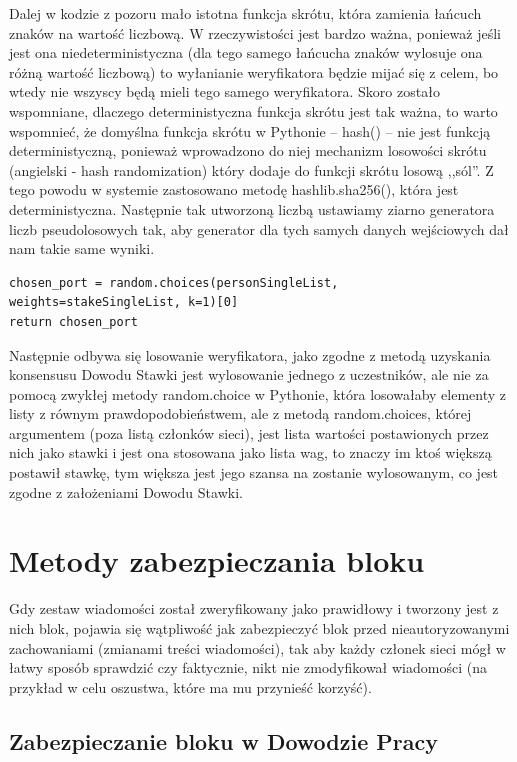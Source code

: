 Dalej w kodzie z pozoru mało istotna funkcja skrótu, która zamienia łańcuch znaków na wartość liczbową. W rzeczywistości jest bardzo ważna, ponieważ jeśli jest ona niedeterministyczna (dla tego samego łańcucha znaków wylosuje ona różną wartość liczbową) to wyłanianie weryfikatora będzie mijać się z celem, bo wtedy nie wszyscy będą mieli tego samego weryfikatora. Skoro zostało wspomniane, dlaczego deterministyczna funkcja skrótu jest tak ważna, to warto wspomnieć, że domyślna funkcja skrótu w Pythonie – hash() – nie jest funkcją deterministyczną, ponieważ wprowadzono do niej mechanizm losowości skrótu (angielski - hash randomization) który dodaje do funkcji skrótu losową ,,sól”. Z tego powodu w systemie zastosowano metodę hashlib.sha256(), która jest deterministyczna. Następnie tak utworzoną liczbą ustawiamy ziarno generatora liczb pseudolosowych tak, aby generator dla tych samych danych wejściowych dał nam takie same wyniki.

\begin{lstlisting}[caption={Losowanie weryfikatora}]
chosen_port = random.choices(personSingleList, 
weights=stakeSingleList, k=1)[0]
return chosen_port
\end{lstlisting}

Następnie odbywa się losowanie weryfikatora, jako zgodne z metodą uzyskania konsensusu Dowodu Stawki jest wylosowanie jednego z uczestników, ale nie za pomocą zwykłej metody random.choice w Pythonie, która losowałaby elementy z listy z równym prawdopodobieństwem, ale z metodą random.choices, której argumentem (poza listą członków sieci), jest lista wartości postawionych przez nich jako stawki i jest ona stosowana jako lista wag, to znaczy im ktoś większą postawił stawkę, tym większa jest jego szansa na zostanie wylosowanym, co jest zgodne z założeniami Dowodu Stawki.

\section{Metody zabezpieczania bloku}

Gdy zestaw wiadomości został zweryfikowany jako prawidłowy i tworzony jest z nich blok, pojawia się wątpliwość jak zabezpieczyć blok przed nieautoryzowanymi zachowaniami  (zmianami treści wiadomości), tak aby każdy członek sieci mógł w łatwy sposób sprawdzić czy faktycznie, nikt nie zmodyfikował wiadomości (na przykład w celu oszustwa, które ma mu przynieść korzyść).

\subsection{Zabezpieczanie bloku w Dowodzie Pracy}

